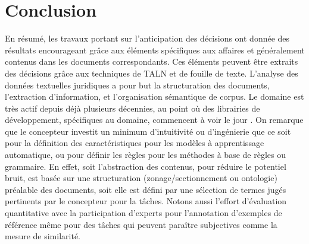 \section{Conclusion}
\label{sec:literature:conclusion}
En résumé, les travaux portant sur l'anticipation des décisions ont donnée des résultats encourageant grâce aux éléments spécifiques aux affaires et généralement contenus dans les documents correspondants. Ces éléments peuvent être extraits des décisions grâce aux techniques de TALN et de fouille de texte.  L'analyse des données textuelles juridiques a pour but la structuration des documents, l'extraction d'information, et l'organisation sémantique de corpus. Le domaine est très actif depuis déjà plusieurs décennies, au point où des librairies de développement, spécifiques au domaine, commencent à voir le jour \citep{bommarito2018lexnlp}. On remarque que le concepteur investit un minimum d'intuitivité ou d'ingénierie que ce soit pour la définition des caractéristiques pour les modèles à apprentissage automatique, ou pour définir les règles pour les méthodes à base de règles ou grammaire. En effet, soit l'abstraction des contenus, pour réduire le potentiel bruit, est basée sur une structuration (zonage/sectionnement ou ontologie) préalable des documents, soit elle est défini par une sélection de termes jugés pertinents par le concepteur pour la tâches. Notons aussi l'effort d'évaluation quantitative avec la participation d'experts pour l'annotation d'exemples de référence même pour des tâches qui peuvent paraître subjectives comme la mesure de similarité.



